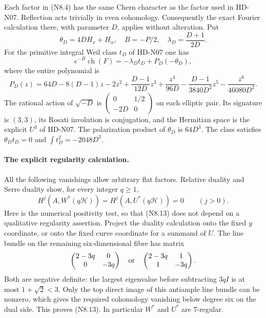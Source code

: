 Each factor in (N8.4) has the same Chern character as the factor
used in HD-N07. Reflection acts trivially in even cohomology.
Consequently the exact Fourier calculation there, with parameter
$D$, applies without alteration. Put
\[
 \theta_D=4D H_x+H_\alpha,\quad B=-P/2,
 \quad\lambda_D=\frac{D+1}{2D}.
\]
For the primitive integral Weil class $t_D$ of HD-N07 one has
\[
 e^{-B}\operatorname{ch}(F)=-\lambda_Dt_D+P_D(-\theta_D),
                                                               \tag{N8.11}
\]
where the entire polynomial is
\[
 P_D(z)=64D-8(D-1)z-2z^2+\frac{D-1}{12D}z^3
       +\frac{z^4}{96D}-\frac{D-1}{3840D^2}z^5
       -\frac{z^6}{46080D^2}.                              \tag{N8.12}
\]
The rational action of $\sqrt{-D}$ is
$\left(\begin{smallmatrix}0&1/2\\-2D&0\end{smallmatrix}\right)$
on each elliptic pair. Its signature is $(3,3)$, its Rosati
involution is conjugation, and the Hermitian space is the explicit
$U^3$ of HD-N07. The polarization product of $\theta_D$ is $64D^3$.
The class satisfies $\theta_Dt_D=0$ and
$\int t_D^2=-2048D^3$.

\paragraph{The explicit regularity calculation.}
All the following vanishings allow arbitrary flat factors.
Relative duality and Serre duality show, for every integer $q\ge1$,
\[
 H^j(A,W^*(q\mathcal H))=H^j(A,U^*(q\mathcal H))=0
 \qquad(j>0).                                             \tag{N8.13}
\]
Here is the numerical positivity test, so that (N8.13) does not
depend on a qualitative regularity assertion. Project the duality
calculation onto the fixed $y$ coordinate, or onto the fixed curve
coordinate for a summand of $U$. The line bundle on the remaining
six-dimensional fibre has matrix
\[
 \begin{pmatrix}2-3q&0\\0&-3q\end{pmatrix}
 \quad\hbox{or}\quad
 \begin{pmatrix}2-3q&1\\1&-3q\end{pmatrix}.
\]
Both are negative definite: the largest eigenvalue before
subtracting $3qI$ is at most $1+\sqrt2<3$. Only the top direct
image of this antiample line bundle can be nonzero, which gives
the required cohomology vanishing below degree six on the dual
side. This proves (N8.13). In particular $W^*$ and $U^*$ are
$7$-regular.

